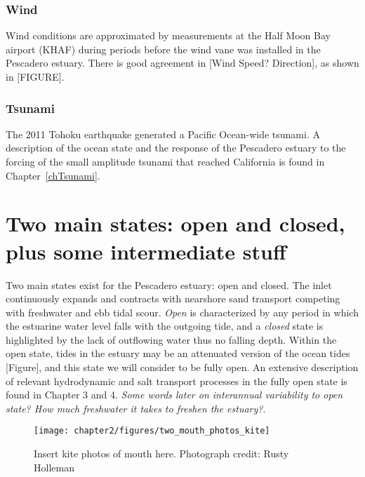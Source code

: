 \subsubsection{Wind}
Wind conditions are approximated by measurements at the Half Moon Bay airport (KHAF) during periods before the wind vane was installed in the Pescadero estuary.  There is good agreement in [Wind Speed? Direction], as shown in [FIGURE].

\subsubsection{Tsunami}
The 2011 Tohoku earthquake generated a Pacific Ocean-wide tsunami. A description of the ocean state and the response of the Pescadero estuary to the forcing of the small amplitude tsunami that reached California is found in Chapter~\ref{chTsunami}.



\section{Two main states: open and closed, plus some intermediate stuff}
\label{betterlabelmaybe}

Two main states exist for the Pescadero estuary: open and closed.  The inlet continuously expands and contracts with nearshore sand transport competing with freshwater and ebb tidal scour. \emph{Open} is characterized by any period in which the estuarine water level falls with the outgoing tide, and a \emph{closed} state is highlighted by the lack of outflowing water thus no falling depth. Within the open state, tides in the estuary may be an attenuated version of the ocean tides [Figure], and this state we will consider to be fully open. An extensive description of relevant hydrodynamic and salt transport processes in the fully open state is found in Chapter 3 and 4. \emph{Some words later on interannual variability to open state? How much freshwater it takes to freshen the estuary?}.

\begin{figure}
\texttt{[image: chapter2/figures/two\_mouth\_photos\_kite]} 
\caption{Insert kite photos of mouth here. Photograph credit: Rusty Holleman}\label{fig:kite_photos} \end{figure}

